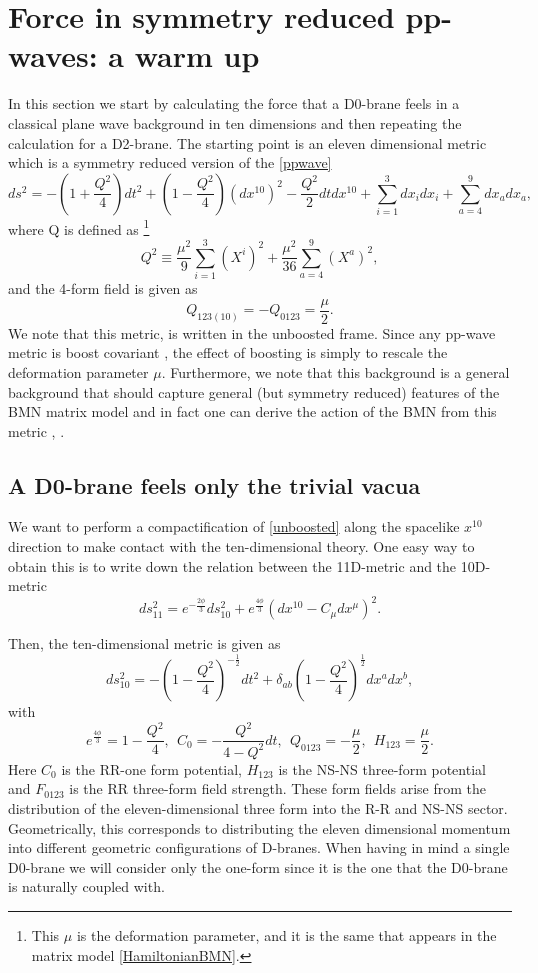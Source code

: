 \documentclass[11pt,english]{article}
\newcommand{\be}{\begin{equation}}
\newcommand{\ee}{\end{equation}}
\numberwithin{equation}{section}
\begin{document}
\section{Force in symmetry reduced pp-waves: a warm up}\label{classicalforce}
In this section we start by calculating the force that a D0-brane feels in a classical plane wave background in ten dimensions and then repeating the calculation for a D2-brane. The starting point is  an eleven dimensional metric which is a symmetry reduced version of the \eqref{ppwave}
\be \label{unboosted}
ds^2=-(1+\frac{Q^2}{4})dt^2+(1-\frac{Q^2}{4})(dx^{10})^2-\frac{Q^2}{2}dtdx^{10}+\sum_{i=1}^{3}dx_idx_i+\sum_{a=4}^9dx_adx_a,
\ee 
where Q is defined as \footnote{This $\mu$ is the deformation parameter, and it is the same that appears in the matrix model \eqref{HamiltonianBMN}.}
\be \label{Fdefin}
Q^2\equiv\frac{\mu^2}{9}\sum_{i=1}^3(X^i)^2+\frac{\mu^2}{36}\sum_{a=4}^9(X^a)^2,
\ee
 and the 4-form field is given as 
\be 
Q_{123(10)}=-Q_{0123}=\frac{\mu }{2}.
\ee
We note that this metric, is written in the unboosted frame. Since any pp-wave metric is boost covariant \cite{Blau2004}, the effect of boosting is simply to rescale the deformation parameter $\mu$.  Furthermore, we note that this background is a general background that should capture general (but symmetry reduced) features of the BMN matrix model and in fact one can derive the action of the BMN from this metric \cite{Dasgupta2002}, \cite{TaylorIV1999}.

\subsection{A D0-brane feels only the trivial vacua}\label{D0reduced}
We want to perform a compactification of \eqref{unboosted} along the  spacelike $x^{10}$ direction to make contact with the ten-dimensional theory. One easy way to obtain this is to write down the relation between the 11D-metric and the 10D-metric
\be 
ds^2_{11}=e^{-\frac{2\phi}{3}}ds_{10}^2+e^{\frac{4\phi}{3}}\left(dx^{10}-C_\mu dx^\mu\right)^2.
\ee

\noindent
Then, the ten-dimensional metric is given as 
\be \label{compacified}
ds^2_{10}=-\left(1-\frac{Q^2}{4}\right)^{-\frac{1}{2}}dt^2+\delta_{ab}\left(1-\frac{Q^2}{4}\right)^{\frac{1}{2}}dx^adx^b,
\ee
with 
\be 
e^{\frac{4\phi}{3}}=1-\frac{Q^2}{4},~~C_0=-\frac{Q^2}{4-Q^2}dt,~~ Q_{0123}=-\frac{\mu }{2},~~ H_{123}=\frac{\mu}{2}.
\ee
Here $C_0$ is the RR-one form potential, $H_{123}$ is the NS-NS three-form potential and $F_{0123}$ is the RR three-form field strength. These form fields arise from the distribution of the eleven-dimensional three form into the R-R and NS-NS sector.  Geometrically, this corresponds to distributing the eleven dimensional momentum into different geometric configurations of  D-branes. When having in mind a single D0-brane we will consider only the one-form since it is the one that the D0-brane is naturally coupled with.
\end{document}
